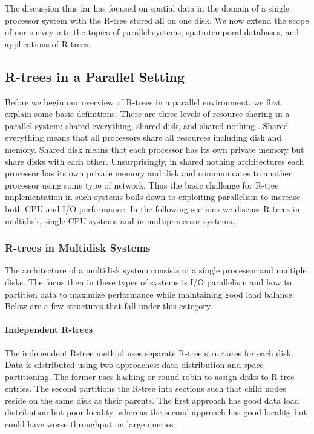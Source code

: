 The discussion thus far has focused on spatial data in the domain of a single
processor system with the R-tree stored all on one disk. We now extend the 
scope of our survey into the topics of parallel systems, 
spatiotemporal databases, and applications of R-trees.

\subsection{R-trees in a Parallel Setting}
Before we begin our overview of R-trees in a parallel environment, we first 
explain some basic definitions. There are three levels of resource sharing in
a parallel system: shared everything, shared disk, and shared nothing
\cite{thebook}. Shared everything means that all processors share all 
resources including disk and memory. Shared disk means that each processor 
has its own private memory but share disks with each other. Unsurprisingly, 
in shared nothing 
architectures each processor has its own private memory and disk and 
communicates to another processor using some type of network. 
Thus the basic challenge for R-tree 
implementation in such systems boils down to exploiting parallelism to 
increase both CPU and I/O performance. In the following sections we discuss
R-trees in multidisk, single-CPU systems and in multiprocessor systems.

\subsubsection{R-trees in Multidisk Systems}
The architecture of a multidisk system consists of a single processor and 
multiple disks. The focus then in these types of systems is I/O parallelism
and how to partition data to maximize performance while maintaining good load
balance. Below are a few structures that fall under this category.

\paragraph{Independent R-trees}
The independent R-tree method \cite{kamel1992parallel, thebook} uses separate 
R-tree structures for each disk.
Data is distributed using two approaches: data distribution and space 
partitioning. The former uses hashing or round-robin to assign disks to
R-tree entries. The second partitions the R-tree into sections such that 
child nodes reside on the same disk as their parents. The first approach 
has good data load distribution but poor locality, whereas the second approach
has good locality but could have worse throughput on large queries.

